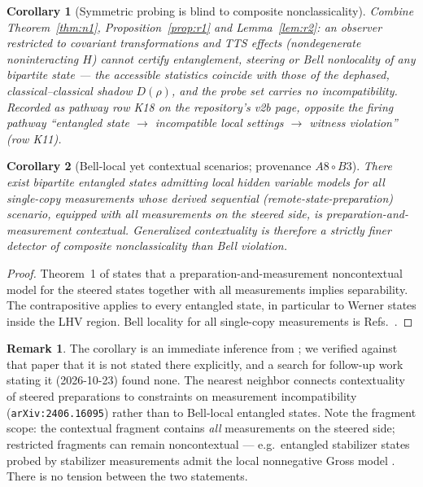 \documentclass[11pt,a4paper]{article}
\newtheorem{corollary}{Corollary}
\theoremstyle{definition}
\newtheorem{remark}{Remark}
\begin{document}
\begin{corollary}[Symmetric probing is blind to composite
nonclassicality]\label{cor:k18}
Combine Theorem~\ref{thm:n1}, Proposition~\ref{prop:r1} and
Lemma~\ref{lem:r2}: an observer restricted to covariant transformations and
TTS effects (nondegenerate noninteracting $H$) cannot certify entanglement,
steering or Bell nonlocality of \emph{any} bipartite state --- the accessible
statistics coincide with those of the dephased, classical--classical shadow
$D(\rho)$, and the probe set carries no incompatibility. Recorded as pathway
row K18 on the repository's v2b page, opposite the firing pathway
``entangled state $\to$ incompatible local settings $\to$ witness violation''
(row K11).
\end{corollary}

\begin{corollary}[Bell-local yet contextual scenarios; provenance
$A8\circ B3$]\label{cor:r3}
There exist bipartite entangled states admitting local hidden variable models
for all single-copy measurements \cite{werner1989,barrett2002} whose derived
sequential (remote-state-preparation) scenario, equipped with all measurements
on the steered side, is preparation-and-measurement contextual. Generalized
contextuality is therefore a strictly finer detector of composite
nonclassicality than Bell violation.
\end{corollary}
\begin{proof}
Theorem~1 of \cite{plavala2024} states that a preparation-and-measurement
noncontextual model for the steered states together with all measurements
implies separability. The contrapositive applies to every entangled state,
in particular to Werner states inside the LHV region. Bell locality for all
single-copy measurements is Refs.~\cite{werner1989,barrett2002}.
\end{proof}

\begin{remark}
The corollary is an immediate inference from \cite{plavala2024}; we verified
against that paper that it is not stated there explicitly, and a search for
follow-up work stating it (2026-10-23) found none. The nearest neighbor
connects contextuality of steered preparations to constraints on measurement
incompatibility (\texttt{arXiv:2406.16095}) rather than to Bell-local
entangled states. Note the fragment scope: the
contextual fragment contains \emph{all} measurements on the steered side;
restricted fragments can remain noncontextual --- e.g.\ entangled stabilizer
states probed by stabilizer measurements admit the local nonnegative Gross
model \cite{gross2006,schmid2022}. There is no tension between the two
statements.
\end{remark}
\end{document}
